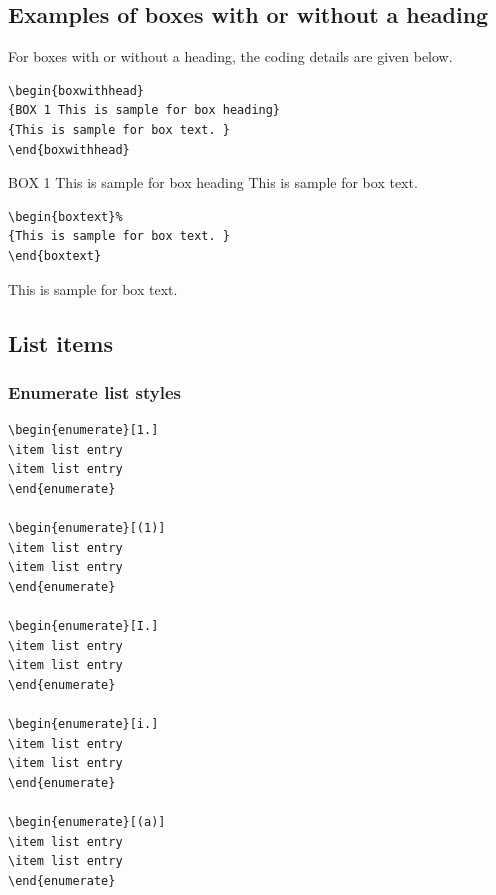 \documentclass[11pt]{article}
\begin{document}
\subsection{Examples of boxes with or without a heading}
For  boxes with or without a heading, the coding details are given below.
\begin{verbatim}
\begin{boxwithhead}
{BOX 1 This is sample for box heading}
{This is sample for box text. }
\end{boxwithhead}
\end{verbatim}

\begin{boxwithhead}
{BOX 1 This is sample for box heading}
{This is sample for box text. }
\end{boxwithhead}

\enlargethispage{16pt}

\begin{verbatim}
\begin{boxtext}%
{This is sample for box text. }
\end{boxtext}
\end{verbatim}

\begin{boxtext}%
{This is sample for box text. }
\end{boxtext}


\subsection{List items}

\subsubsection{Enumerate list styles}
\begin{verbatim}
\begin{enumerate}[1.]
\item list entry
\item list entry
\end{enumerate}

\begin{enumerate}[(1)]
\item list entry
\item list entry
\end{enumerate}

\begin{enumerate}[I.]
\item list entry
\item list entry
\end{enumerate}

\begin{enumerate}[i.]
\item list entry
\item list entry
\end{enumerate}

\begin{enumerate}[(a)]
\item list entry
\item list entry
\end{enumerate}
\end{verbatim}
\end{document}
